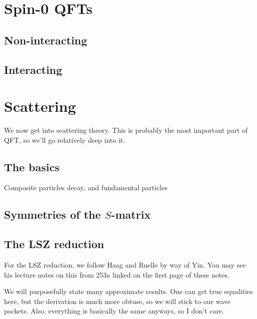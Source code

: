 \documentclass[11pt]{article}
\begin{document}
\begin{eexample}
\end{eexample}

\section{Spin-0 QFTs}

\subsection{Non-interacting}

\subsection{Interacting}

\section{Scattering}

We now get into scattering theory. This is probably the most
important part of QFT, so we'll go relatively deep into it.

\subsection{The basics}

Composite particles decay, and fundamental particles 

\subsection{Symmetries of the $S$-matrix}

\subsection{The LSZ reduction}

\begin{reemark}
    For the LSZ reduction, we follow Haag and Ruelle by way of Yin.
    You may see his lecture notes on this from 253a linked on the
    first page of these notes.

    We will purposefully state many approximate results. One can get true equalities
    here, but the derivation is much more obtuse, so we will stick to our wave
    packets. Also, everything is basically the same anyways, so I don't care.
\end{reemark}
\end{document}
